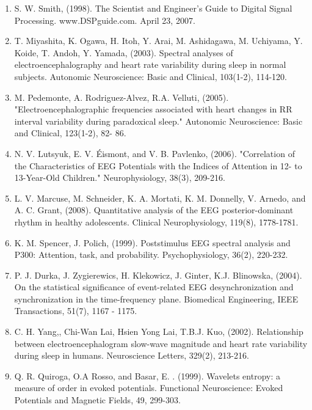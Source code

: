 \documentclass[12pt, a4paper]{article}
\begin{document}
\begin{enumerate}

\item  S. W. Smith, (1998). The Scientist and Engineer's Guide to Digital Signal Processing. www.DSPguide.com. April 23, 2007.

\item  T. Miyashita, K. Ogawa, H. Itoh, Y. Arai, M. Ashidagawa, M. Uchiyama, Y. Koide,
T. Andoh, Y. Yamada, (2003). Spectral analyses of electroencephalography and
heart rate variability during sleep in normal subjects. Autonomic Neuroscience:
Basic and Clinical, 103(1-2), 114-120.

\item  M. Pedemonte, A. Rodriguez-Alvez, R.A. Velluti,  (2005). "Electroencephalographic
frequencies associated with heart changes in RR interval variability during
paradoxical sleep." Autonomic Neuroscience: Basic and Clinical, 123(1-2), 82-
86.

\item  N. V. Lutsyuk, E. V. Éismont, and V. B. Pavlenko, (2006). "Correlation of the Characteristics of EEG Potentials with the Indices of Attention in 12- to 13-Year-Old Children." Neurophysiology, 38(3), 209-216.

\item  L. V. Marcuse, M. Schneider, K. A. Mortati, K. M. Donnelly, V. Arnedo, and A. C. Grant, (2008). Quantitative analysis of the EEG posterior-dominant rhythm in healthy adolescents. Clinical Neurophysiology, 119(8), 1778-1781.

\item   K. M. Spencer, J. Polich, (1999). Poststimulus EEG spectral analysis and P300: Attention, task, and probability. Psychophysiology, 36(2), 220-232.

\item  P. J. Durka,  J. Zygierewics, H. Klekowicz, J. Ginter, K.J. Blinowska, (2004). On the statistical significance of event-related EEG desynchronization and synchronization in the time-frequency plane. Biomedical Engineering, IEEE Transactions, 51(7), 1167 - 1175.

\item  C. H. Yang,, Chi-Wan Lai, Hsien Yong Lai, T.B.J. Kuo, (2002). Relationship between electroencephalogram slow-wave magnitude and heart rate variability during sleep in humans. Neuroscience Letters, 329(2), 213-216.

\item  Q. R. Quiroga, O.A Rosso, and Basar, E. . (1999). Wavelets entropy: a measure of order in evoked potentials. Functional Neuroscience: Evoked Potentials and Magnetic Fields, 49, 299-303.


\end{enumerate}
\end{document}
